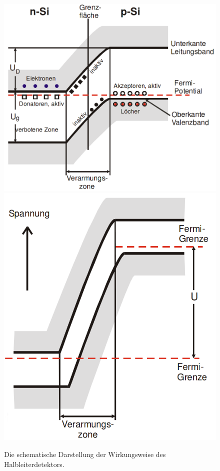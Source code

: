 \begin{figure}
	\centering
    \includegraphics[width=\linewidth-200pt,height=\textheight-200pt,keepaspectratio]{content/Images/detek.png}
    \includegraphics[width=\linewidth-200pt,height=\textheight-200pt,keepaspectratio]{content/Images/fermikante.png}
    \caption{Die schematische Darstellung der Wirkungsweise des Halbleiterdetektors\cite{V18}.}
    \label{fig:POTENTIAL}
\end{figure}
